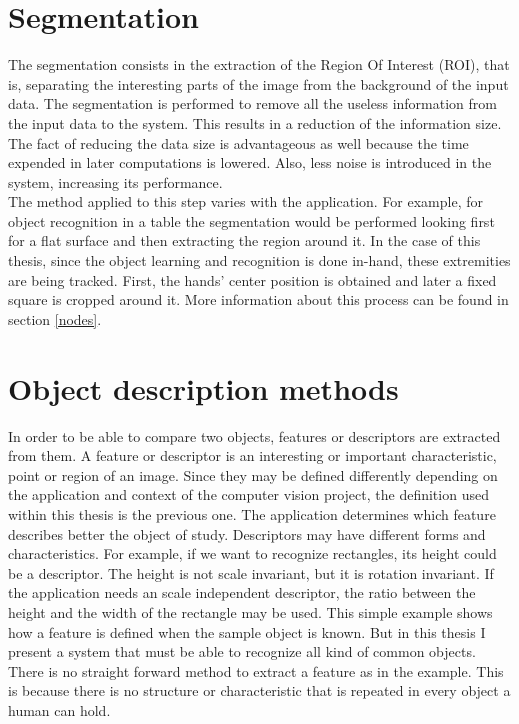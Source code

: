 \section{Segmentation}
\label{segmentation}
The segmentation consists in the extraction of the Region Of Interest (ROI), that is, separating the interesting parts of the image from the background of the input data. 
The segmentation is performed to remove all the useless information from the input data to the system. 
This results in a reduction of the information size. 
The fact of reducing the data size is advantageous as well because the time expended in later computations is lowered. 
Also, less noise is introduced in the system, increasing its performance. 
\\

The method applied to this step varies with the application. 
For example, for object recognition in a table the segmentation would be performed looking first for a flat surface and then extracting the region around it. 
In the case of this thesis, since the object learning and recognition is done in-hand, these extremities are being tracked. 
First, the hands' center position is obtained and later a fixed square is cropped around it. 
More information about this process can be found in section \ref{nodes}.



\section{Object description methods}
\label{descriptors}
In order to be able to compare two objects, features or descriptors are extracted from them. 
A feature or descriptor is an interesting or important characteristic, point or region of an image. 
Since they may be defined differently depending on the application and context of the computer vision project, the definition used within this thesis is the previous one. 
The application determines which feature describes better the object of study. 
Descriptors may have different forms and characteristics. 
For example, if we want to recognize rectangles, its height could be a descriptor.
The height is not scale invariant, but it is rotation invariant. 
If the application needs an scale independent descriptor, the ratio between the height and the width of the rectangle may be used. 
This simple example shows how a feature is defined when the sample object is known. 
But in this thesis I present a system that must be able to recognize all kind of common objects. 
There is no straight forward method to extract a feature as in the example. 
This is because there is no structure or characteristic that is repeated in every object a human can hold. 
 
